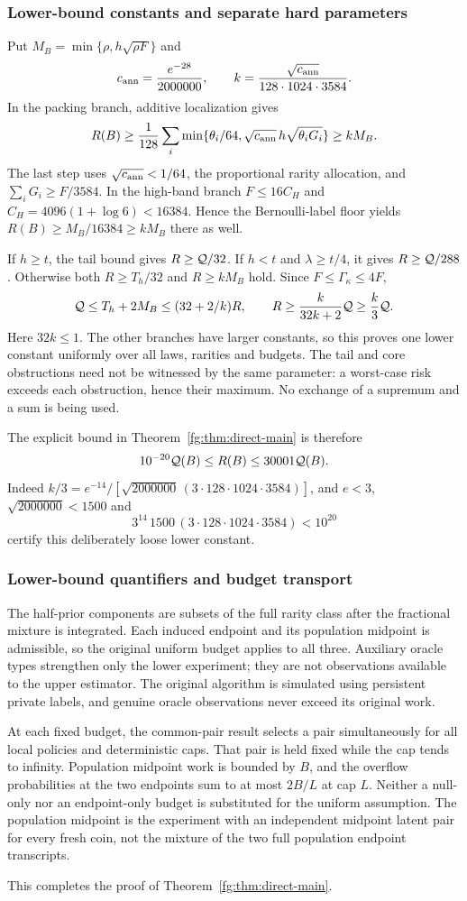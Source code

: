 \subsubsection{Lower-bound constants and separate hard parameters}
Put $M_B=\min\{\rho,h\sqrt{\rho F}\}$ and
\[
 c_{\rm ann}=\frac{e^{-28}}{2000000},\qquad
 k=\frac{\sqrt{c_{\rm ann}}}{128\cdot1024\cdot3584}.
\]
In the packing branch, additive localization gives
\[
 R(B)\ge\frac1{128}\sum_i
      \min\{\theta_i/64,\sqrt{c_{\rm ann}}\,h\sqrt{\theta_iG_i}\}
 \ge k M_B.
\]
The last step uses $\sqrt{c_{\rm ann}}<1/64$, the proportional rarity
allocation, and $\sum_iG_i\ge F/3584$.
In the high-band branch $F\le16C_H$ and
$C_H=4096(1+\log6)<16384$. Hence the Bernoulli-label floor yields
$R(B)\ge M_B/16384\ge kM_B$ there as well.

If $h\ge t$, the tail bound gives $R\ge\mathcal Q/32$.
If $h<t$ and $\lambda\ge t/4$, it gives $R\ge\mathcal Q/288$.
Otherwise both $R\ge T_h/32$ and $R\ge kM_B$ hold. Since
$F\le\Gamma_\kappa\le4F$,
\[
 \mathcal Q\le T_h+2M_B\le(32+2/k)R,
 \qquad R\ge\frac{k}{32k+2}\mathcal Q\ge\frac{k}{3}\mathcal Q.
\]
Here $32k\le1$. The other branches have larger constants, so this proves
one lower constant uniformly over all laws, rarities and budgets.
The tail and core obstructions need not be witnessed by the same
parameter: a worst-case risk exceeds each obstruction, hence their
maximum. No exchange of a supremum and a sum is being used.

The explicit bound in Theorem~\ref{fg:thm:direct-main} is therefore
\[
             10^{-20}\mathcal Q(B)\le R(B)\le30001\mathcal Q(B).
\]
Indeed $k/3=e^{-14}/[\sqrt{2000000}\,(3\cdot128\cdot1024\cdot3584)]$,
and $e<3$, $\sqrt{2000000}<1500$ and
\[
 3^{14}\,1500\,(3\cdot128\cdot1024\cdot3584)<10^{20}
\]
certify this deliberately loose lower constant.

\subsubsection{Lower-bound quantifiers and budget transport}
The half-prior components are subsets of the full rarity class after
the fractional mixture is integrated. Each induced endpoint and its
population midpoint is admissible, so the original uniform budget
applies to all three. Auxiliary oracle types strengthen only the lower
experiment; they are not observations available to the upper estimator.
The original algorithm is simulated using persistent private labels,
and genuine oracle observations never exceed its original work.

At each fixed budget, the common-pair result selects a pair simultaneously
for all local policies and deterministic caps. That pair is held fixed
while the cap tends to infinity. Population midpoint work is bounded by
$B$, and the overflow probabilities at the two endpoints sum to at most
$2B/L$ at cap $L$. Neither a null-only nor an endpoint-only budget is
substituted for the uniform assumption. The population midpoint is the
experiment with an independent midpoint latent pair for every fresh
coin, not the mixture of the two full population endpoint transcripts.

This completes the proof of Theorem~\ref{fg:thm:direct-main}.
